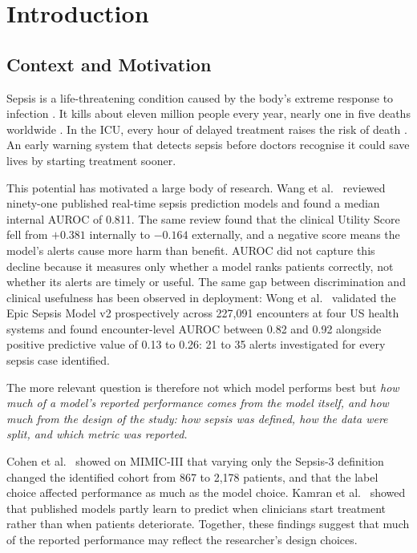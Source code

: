 \chapter{Introduction}
\label{ch:introduction}


\section{Context and Motivation}

Sepsis is a life-threatening condition caused by the body's extreme response to
infection \cite{singer2016sepsis3}. It kills about eleven million people
every year, nearly one in five deaths worldwide
\cite{rudd2020global}. In the ICU, every hour of delayed treatment raises
the risk of death \cite{seymour2017time}. An early warning system that
detects sepsis before doctors recognise it could save lives by starting
treatment sooner.

This potential has motivated a large body of research. Wang et al.\
\cite{wang2025srpm} reviewed ninety-one published real-time sepsis
prediction models and found a median internal AUROC of 0.811. The same review
found that the clinical Utility Score fell from $+0.381$ internally to
$-0.164$ externally, and a negative score means the model's alerts cause more
harm than benefit. AUROC did not capture this decline because it measures only
whether a model ranks patients correctly, not whether its alerts are timely or
useful. The same gap between discrimination and clinical usefulness has been
observed in deployment: Wong et al.\ \cite{wong2026epic} validated the Epic Sepsis
Model v2 prospectively across 227,091 encounters at four US health systems and
found encounter-level AUROC between 0.82 and 0.92 alongside positive predictive
value of 0.13 to 0.26: 21 to 35 alerts investigated for every sepsis case
identified.

The more relevant question is therefore not which model performs best but
\textit{how much of a model's reported performance comes from the model itself,
and how much from the design of the study: how sepsis was defined, how the data
were split, and which metric was reported.}

Cohen et al.\ \cite{cohen2024subtle} showed on MIMIC-III that varying only
the Sepsis-3 definition changed the identified cohort from 867 to 2,178
patients, and that the label choice affected performance as much as the model
choice. Kamran et al.\ \cite{kamran2024evaluation} showed that published
models partly learn to predict when clinicians start treatment rather than when
patients deteriorate. Together, these findings suggest that much of the reported
performance may reflect the researcher's design choices.

